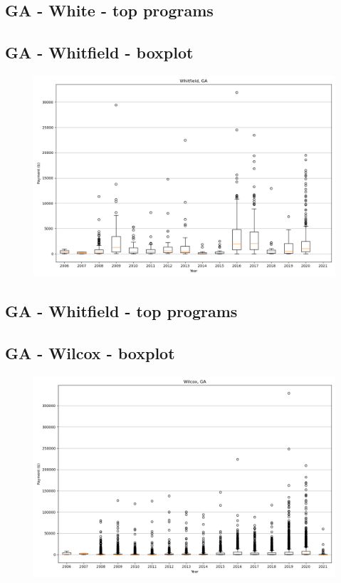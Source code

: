 \subsection*{GA - White - top programs}

\newpage
\subsection*{GA - Whitfield - boxplot}
\begin{figure}[h]
\centering
\includegraphics[width=7in]{../output/boxplots/counties/Whitfield-GA_boxplot.png}
\end{figure}


\subsection*{GA - Whitfield - top programs}

\newpage
\subsection*{GA - Wilcox - boxplot}
\begin{figure}[h]
\centering
\includegraphics[width=7in]{../output/boxplots/counties/Wilcox-GA_boxplot.png}
\end{figure}


